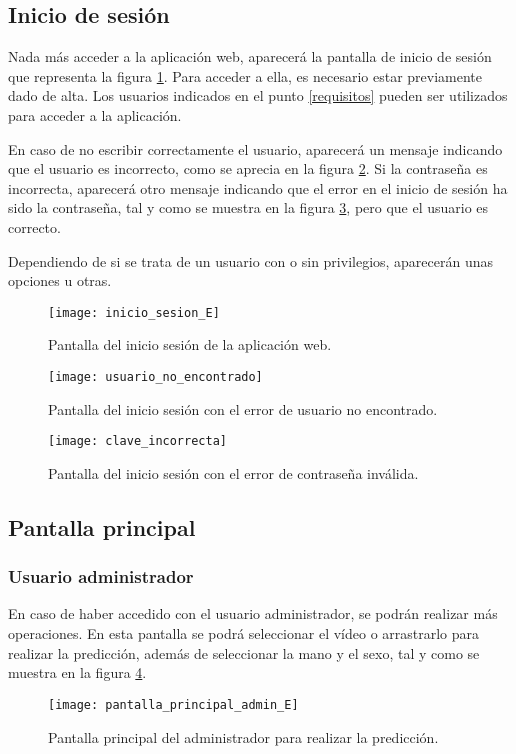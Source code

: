 \subsection{Inicio de sesión}
Nada más acceder a la aplicación web, aparecerá la pantalla de inicio de sesión que representa la figura \ref{fig:inicio_sesion_E}. Para acceder a ella, es necesario estar previamente dado de alta. Los usuarios indicados en el punto \ref{requisitos} pueden ser utilizados para acceder a la aplicación.

En caso de no escribir correctamente el usuario, aparecerá un mensaje indicando que el usuario es incorrecto, como se aprecia en la figura \ref{fig:usuario_no_encontrado_E}. Si la contraseña es incorrecta, aparecerá otro mensaje indicando que el error en el inicio de sesión ha sido la contraseña, tal y como se muestra en la figura \ref{fig:clave_incorrecta_E}, pero que el usuario es correcto.

Dependiendo de si se trata de un usuario con o sin privilegios, aparecerán unas opciones u otras.

\begin{figure}[ht]
	\texttt{[image: inicio\_sesion\_E]}
	\caption{Pantalla del inicio sesión de la aplicación web.}
	\label{fig:inicio_sesion_E}
\end{figure}

\begin{figure}[ht]
	\texttt{[image: usuario\_no\_encontrado]}
	\caption{Pantalla del inicio sesión con el error de usuario no encontrado.}
	\label{fig:usuario_no_encontrado_E}
\end{figure}

\begin{figure}[ht]
	\texttt{[image: clave\_incorrecta]}
	\caption{Pantalla del inicio sesión con el error de contraseña inválida.}
	\label{fig:clave_incorrecta_E}
\end{figure}

\subsection{Pantalla principal}

\subsubsection{Usuario administrador}
En caso de haber accedido con el usuario administrador, se podrán realizar más operaciones. En esta pantalla se podrá seleccionar el vídeo o arrastrarlo para realizar la predicción, además de seleccionar la mano y el sexo, tal y como se muestra en la figura \ref{fig:pantalla_principal_admin_E}.

\begin{figure}[ht]
	\texttt{[image: pantalla\_principal\_admin\_E]}
	\caption{Pantalla principal del administrador para realizar la predicción.}
	\label{fig:pantalla_principal_admin_E}
\end{figure}
